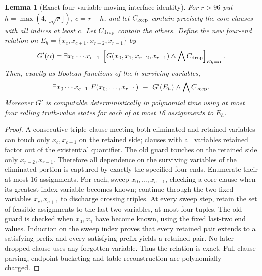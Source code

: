 \documentclass[11pt]{article}
\newtheorem{lemma}[theorem]{Lemma}
\begin{document}
\begin{lemma}[Exact four-variable moving-interface identity]
For $r>96$ put $h=\max(4,\lfloor\sqrt r\rfloor)$, $c=r-h$, and let $C_{\rm keep}$ contain precisely the core clauses with all indices at least $c$. Let $C_{\rm drop}$ contain the others. Define the new four-end relation on
$E_h=\{x_c,x_{c+1},x_{r-2},x_{r-1}\}$ by
\[
 G'(\alpha)=\exists x_0\cdots x_{c-1}\;
    \left[G(x_0,x_1,x_{r-2},x_{r-1})\wedge
                 \bigwedge C_{\rm drop}\right]_{E_h=\alpha}.
\]
Then, exactly as Boolean functions of the $h$ surviving variables,
\[
 \exists x_0\cdots x_{c-1}\;F(x_0,\ldots,x_{r-1})
 \ \equiv\ G'(E_h)\wedge\bigwedge C_{\rm keep}.
\]
Moreover $G'$ is computable deterministically in polynomial time using at most four rolling truth-value states for each of at most 16 assignments to $E_h$.
\end{lemma}
\begin{proof}
A consecutive-triple clause meeting both eliminated and retained variables can touch only $x_c,x_{c+1}$ on the retained side; clauses with all variables retained factor out of the existential quantifier. The old guard touches on the retained side only $x_{r-2},x_{r-1}$. Therefore all dependence on the surviving variables of the eliminated portion is captured by exactly the specified four ends. Enumerate their at most 16 assignments. For each, sweep $x_0,\ldots,x_{c-1}$, checking a core clause when its greatest-index variable becomes known; continue through the two fixed variables $x_c,x_{c+1}$ to discharge crossing triples. At every sweep step, retain the set of feasible assignments to the last two variables, at most four tuples. The old guard is checked when $x_0,x_1$ have become known, using the fixed last-two end values. Induction on the sweep index proves that every retained pair extends to a satisfying prefix and every satisfying prefix yields a retained pair. No later dropped clause uses any forgotten variable. Thus the relation is exact. Full clause parsing, endpoint bucketing and table reconstruction are polynomially charged.
\end{proof}
\end{document}

